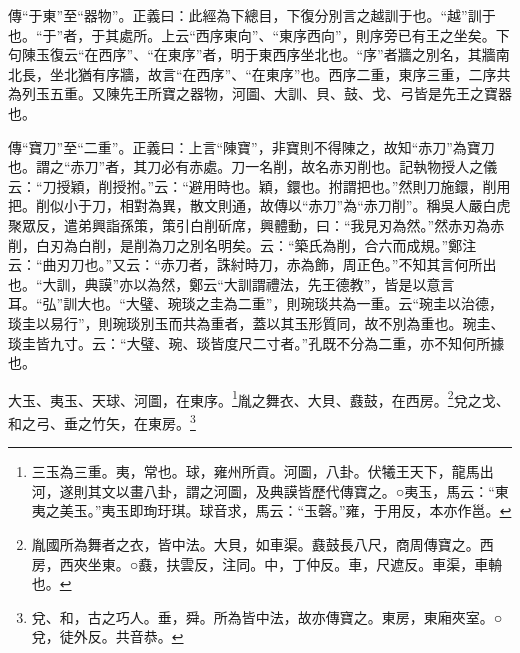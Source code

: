 {\noindent\zhuan{}\fzbyks 傳“于東”至“器物”。正義曰：此經為下總目，下復分別言之越訓于也。“越”訓于也。“于”者，于其處所。上云“西序東向”、“東序西向”，則序旁已有王之坐矣。下句陳玉復云“在西序”、“在東序”者，明于東西序坐北也。“序”者牆之別名，其牆南北長，坐北猶有序牆，故言“在西序”、“在東序”也。西序二重，東序三重，二序共為列玉五重。又陳先王所寶之器物，河圖、大訓、貝、鼓、戈、弓皆是先王之寶器也。 \par}

{\noindent\zhuan{}\fzbyks 傳“寶刀”至“二重”。正義曰：上言“陳寶”，非寶則不得陳之，故知“赤刀”為寶刀也。謂之“赤刀”者，其刀必有赤處。刀一名削，故名赤刃削也。記執物授人之儀云：“刀授穎，削授拊。”云：“避用時也。穎，鐶也。拊謂把也。”然則刀施鐶，削用把。削似小于刀，相對為異，散文則通，故傳以“赤刀”為“赤刀削”。稱吳人嚴白虎聚眾反，遣弟興詣孫策，策引白削斫席，興體動，曰：“我見刃為然。”然赤刃為赤削，白刃為白削，是削為刀之別名明矣。云：“築氏為削，合六而成規。”鄭注云：“曲刃刀也。”又云：“赤刀者，誅紂時刀，赤為飾，周正色。”不知其言何所出也。“大訓，典謨”亦以為然，鄭云“大訓謂禮法，先王德教”，皆是以意言耳。“弘”訓大也。“大璧、琬琰之圭為二重”，則琬琰共為一重。云“琬圭以治德，琰圭以易行”，則琬琰別玉而共為重者，蓋以其玉形質同，故不別為重也。琬圭、琰圭皆九寸。云：“大璧、琬、琰皆度尺二寸者。”孔既不分為二重，亦不知何所據也。 \par}

大玉、夷玉、天球、河圖，在東序。\footnote{三玉為三重。夷，常也。球，雍州所貢。河圖，八卦。伏犧王天下，龍馬出河，遂則其文以畫八卦，謂之河圖，及典謨皆歷代傳寶之。○夷玉，馬云：“東夷之美玉。”夷玉即珣玗琪。球音求，馬云：“玉磬。”雍，于用反，本亦作邕。}胤之舞衣、大貝、鼖鼓，在西房。\footnote{胤國所為舞者之衣，皆中法。大貝，如車渠。鼖鼓長八尺，商周傳寶之。西房，西夾坐東。○鼖，扶雲反，注同。中，丁仲反。車，尺遮反。車渠，車輈也。}兌之戈、和之弓、垂之竹矢，在東房。\footnote{兌、和，古之巧人。垂，舜。所為皆中法，故亦傳寶之。東房，東廂夾室。○兌，徒外反。共音恭。}


